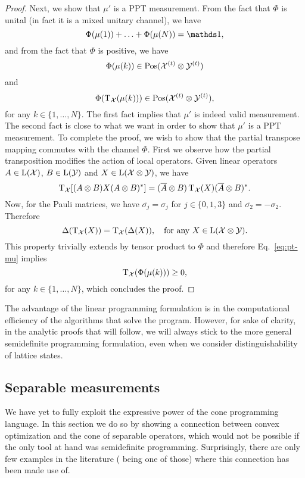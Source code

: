 \begin{proof}
Next, we show that $\mu'$ is a PPT measurement. From the fact that $\Phi$ is unital 
(in fact it is a mixed unitary channel), we have
\begin{equation}
  \Phi(\mu(1)) + \ldots + \Phi(\mu(N)) = \I,
\end{equation}
and from the fact that $\Phi$ is positive, we have 
\begin{equation}
  \Phi(\mu(k)) \in\mathrm{Pos}(\mathcal{X}^{(t)}\otimes\mathcal{Y}^{(t)})
\end{equation}
and
\begin{equation}
\label{eq:pt-mu}
  \Phi(\operatorname{T}_{\mathcal{X}}(\mu(k))) \in\mathrm{Pos}(\mathcal{X}^{(t)}\otimes\mathcal{Y}^{(t)}),
\end{equation}
for any $k \in \{1, \ldots, N \}$. 
The first fact implies that $\mu'$ is indeed valid measurement.
The second fact is close to what we want in order to show that $\mu'$ is a PPT measurement.
To complete the proof, we wish to show that the partial transpose mapping commutes 
with the channel $\Phi$.
First we observe how the partial transposition modifies the action of local operators.
Given linear operators $A\in \mathrm{L}(\mathcal{X})$, $B \in \mathrm{L}(\mathcal{Y})$ and $X \in \mathrm{L}(\mathcal{X} \otimes \mathcal{Y})$, 
we have
\begin{equation}
  \operatorname{T}_{\mathcal{X}} [(A \otimes B)X(A \otimes B)^{*}] = 
  (\overline{A}\otimes B)\operatorname{T}_{\mathcal{X}}(X)(\overline{A}\otimes B)^{*}.
\end{equation}
Now, for the Pauli matrices, we have $\overline{\sigma_{j}} = \sigma_{j}$ 
for $j \in \{ 0,1,3\}$ and $\overline{\sigma_{2}} = -\sigma_{2}$. 
Therefore 
\begin{equation}
  \Delta(\operatorname{T}_{\mathcal{X}}(X)) = \operatorname{T}_{\mathcal{X}}(\Delta(X)), \quad \text{for any $X \in \mathrm{L}(\mathcal{X}\otimes\mathcal{Y})$}.
\end{equation}
This property trivially extends by tensor product to $\Phi$ and therefore 
Eq.~\eqref{eq:pt-mu} implies
\begin{equation}
  \operatorname{T}_{\mathcal{X}}(\Phi(\mu(k))) \geq 0, 
\end{equation}
for any $k \in \{1, \ldots, N\}$, which concludes the proof.
\end{proof}

The advantage of the linear programming formulation is in the computational 
efficiency of the algorithms that solve the program.
However, for sake of clarity, in the analytic proofs that will follow, 
we will always stick to the more general semidefinite programming formulation, 
even when we consider distinguishability of lattice states.

\subsection{Separable measurements}
We have yet to fully exploit the expressive power of the cone programming language.
In this section we do so by showing a connection between convex optimization and
the cone of separable operators, which would not be possible if the only tool at 
hand was semidefinite programming. 
Surprisingly, there are only few examples in the literature (\cite{Gharibian13}
being one of those) where this connection has been made use of.

